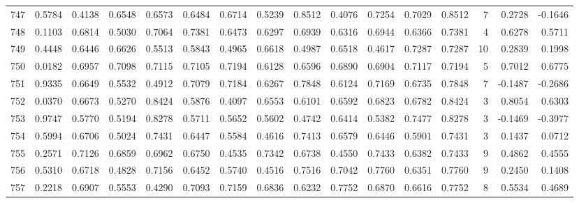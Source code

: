 \begin{tabular}{lrrrrrrrrrrrrrrr}
747 &      0.5784 &  0.4138 &  0.6548 &  0.6573 &  0.6484 &  0.6714 &  0.5239 &  0.8512 &  0.4076 &  0.7254 &   0.7029 &     0.8512 &      7 &                    0.2728 &                    -0.1646 \\
748 &      0.1103 &  0.6814 &  0.5030 &  0.7064 &  0.7381 &  0.6473 &  0.6297 &  0.6939 &  0.6316 &  0.6944 &   0.6366 &     0.7381 &      4 &                    0.6278 &                     0.5711 \\
749 &      0.4448 &  0.6446 &  0.6626 &  0.5513 &  0.5843 &  0.4965 &  0.6618 &  0.4987 &  0.6518 &  0.4617 &   0.7287 &     0.7287 &     10 &                    0.2839 &                     0.1998 \\
750 &      0.0182 &  0.6957 &  0.7098 &  0.7115 &  0.7105 &  0.7194 &  0.6128 &  0.6596 &  0.6890 &  0.6904 &   0.7117 &     0.7194 &      5 &                    0.7012 &                     0.6775 \\
751 &      0.9335 &  0.6649 &  0.5532 &  0.4912 &  0.7079 &  0.7184 &  0.6267 &  0.7848 &  0.6124 &  0.7169 &   0.6735 &     0.7848 &      7 &                   -0.1487 &                    -0.2686 \\
752 &      0.0370 &  0.6673 &  0.5270 &  0.8424 &  0.5876 &  0.4097 &  0.6553 &  0.6101 &  0.6592 &  0.6823 &   0.6782 &     0.8424 &      3 &                    0.8054 &                     0.6303 \\
753 &      0.9747 &  0.5770 &  0.5194 &  0.8278 &  0.5711 &  0.5652 &  0.5602 &  0.4742 &  0.6414 &  0.5382 &   0.7477 &     0.8278 &      3 &                   -0.1469 &                    -0.3977 \\
754 &      0.5994 &  0.6706 &  0.5024 &  0.7431 &  0.6447 &  0.5584 &  0.4616 &  0.7413 &  0.6579 &  0.6446 &   0.5901 &     0.7431 &      3 &                    0.1437 &                     0.0712 \\
755 &      0.2571 &  0.7126 &  0.6859 &  0.6962 &  0.6750 &  0.4535 &  0.7342 &  0.6738 &  0.4550 &  0.7433 &   0.6382 &     0.7433 &      9 &                    0.4862 &                     0.4555 \\
756 &      0.5310 &  0.6718 &  0.4828 &  0.7156 &  0.6452 &  0.5740 &  0.4516 &  0.7516 &  0.7042 &  0.7760 &   0.6351 &     0.7760 &      9 &                    0.2450 &                     0.1408 \\
757 &      0.2218 &  0.6907 &  0.5553 &  0.4290 &  0.7093 &  0.7159 &  0.6836 &  0.6232 &  0.7752 &  0.6870 &   0.6616 &     0.7752 &      8 &                    0.5534 &                     0.4689 \\

\end{tabular}
